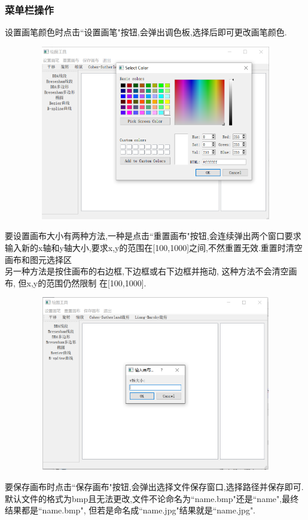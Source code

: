 \documentclass[a4paper,UTF8]{article}
\theoremstyle{definition}
\begin{document}
\subsubsection{菜单栏操作}
设置画笔颜色时点击``设置画笔"按钮,会弹出调色板,选择后即可更改画笔颜色.\\
\begin{figure}[H]
	\includegraphics[width=5in,height=3in]{color.png}
\end{figure}
要设置画布大小有两种方法,一种是点击``重置画布"按钮,会连续弹出两个窗口要求输入新的x轴和y轴大小,要求x,y的范围在[100,1000]之间,不然重置无效.重置时清空画布和图元选择区\\
\indent 另一种方法是按住画布的右边框,下边框或右下边框并拖动, 这种方法不会清空画布, 但x,y的范围仍然限制 在[100,1000].
\begin{figure}[H]
	\includegraphics[width=5in,height=3in]{reset.png}
\end{figure}
要保存画布时点击``保存画布"按钮,会弹出选择文件保存窗口,选择路径并保存即可.默认文件的格式为bmp且无法更改,文件不论命名为``name.bmp"还是``name",最终结果都是``name.bmp", 但若是命名成``name.jpg"结果就是``name.jpg".
\end{document}
